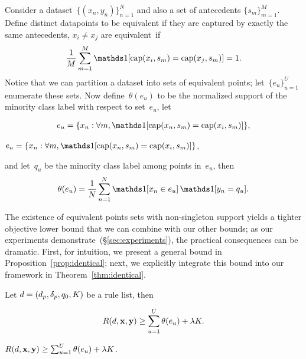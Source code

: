 Consider a dataset~${\{(x_n, y_n)\}_{n=1}^N}$ and also a set of antecedents
${\{s_m\}_{m=1}^M}$.
%
Define distinct datapoints to be equivalent if they are captured by
exactly the same antecedents, \ie ${x_i \neq x_j}$ are equivalent~if
\begin{align}
\frac{1}{M} \sum_{m=1}^M \one [ \Cap(x_i, s_m) = \Cap(x_j, s_m) ] = 1.
\end{align}
Notice that we can partition a dataset into sets of equivalent points;
let~${\{e_u\}_{u=1}^U}$ enumerate these sets.
%
Now define~$\theta(e_u)$ to be the normalized support of the minority
class label with respect to set~$e_u$, \eg let
\begin{arxiv}
\begin{align}
{e_u = \{x_n : \forall m, \one [ \Cap(x_n, s_m) = \Cap(x_i, s_m) ] \}},
\end{align}
\end{arxiv}
\begin{kdd}
${e_u = \{x_n : \forall m, \one [ \Cap(x_n, s_m) = \Cap(x_i, s_m) ] \}}$,
\end{kdd}
and let~$q_u$ be the minority class label among points in~$e_u$, then
\begin{align}
\theta(e_u) = \frac{1}{N} \sum_{n=1}^N \one [ x_n \in e_u ]\, \one [ y_n = q_u ].
\label{eq:theta}
\end{align}

The existence of equivalent points sets with non-singleton support
yields a tighter objective lower bound that we can combine with our other bounds;
as our experiments demonstrate~(\S\ref{sec:experiments}),
the practical consequences can be dramatic.
%
First, for intuition, we present a general bound in
Proposition~\ref{prop:identical}; next, we explicitly integrate
this bound into our framework in Theorem~\ref{thm:identical}.

\begin{proposition}
\label{prop:identical}
Let ${{d} = (d_p, \delta_p, q_0, K)}$ be a rule list, then
\begin{arxiv}
\begin{align}
R({d}, \mathbf{x}, \mathbf{y}) \ge \sum_{u=1}^U \theta(e_u) + {\lambda} K.
\end{align}
\end{arxiv}
\begin{kdd}
${R({d}, \mathbf{x}, \mathbf{y}) \ge \sum_{u=1}^U \theta(e_u) + {\lambda} K}$.
\end{kdd}
\end{proposition}

